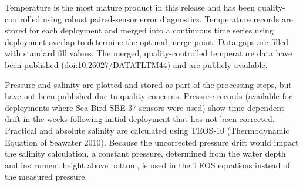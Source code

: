 Temperature is the most mature product in this release and has been quality-controlled using robust paired-sensor error diagnostics. Temperature records are stored for each deployment and merged into a continuous time series using deployment overlap to determine the optimal merge point. Data gaps are filled with standard fill values. The merged, quality-controlled temperature data have been published (\href{https://doi.org/10.26027/DATATLTM44}{doi:10.26027/DATATLTM44}) and are publicly available.

Pressure and salinity are plotted and stored as part of the processing steps, but have not been published due to quality concerns. Pressure records (available for deployments where Sea-Bird SBE-37 sensors were used) show time-dependent drift in the weeks following initial deployment that has not been corrected. Practical and absolute salinity are calculated using TEOS-10 (Thermodynamic Equation of Seawater 2010). Because the uncorrected pressure drift would impact the salinity calculation, a constant pressure, determined from the water depth and instrument height above bottom, is used in the TEOS equations instead of the measured pressure.
